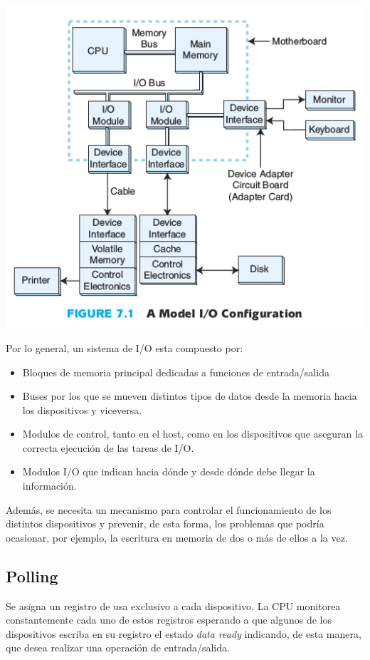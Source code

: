 \begin{center}
	\includegraphics[width=15cm, keepaspectratio=yes]{imagenes/iomodel.png}
\end{center}

Por lo general, un sistema de I/O esta compuesto por:
\begin{itemize}
	\item Bloques de memoria principal dedicadas a funciones de entrada/salida
	\item Buses por los que se mueven distintos tipos de datos desde la memoria hacia los dispositivos y viceversa.
	\item Modulos de control, tanto en el host, como en los dispositivos que aseguran la correcta ejecución de las tareas de I/O.
	\item Modulos I/O que indican hacia dónde y desde dónde debe llegar la información.
\end{itemize}

Además, se necesita un mecanismo para controlar el funcionamiento de los distintos dispositivos y prevenir, de esta forma, los problemas que podría ocasionar, por ejemplo, la escritura en memoria de dos o más de ellos a la vez.

\subsection{Polling}
Se asigna un registro de usa exclusivo a cada dispositivo. La CPU monitorea constantemente cada uno de estos registros esperando a que algunos de los dispositivos escriba en su registro el estado \textit{data ready} indicando, de esta manera, que desea realizar una operación de entrada/salida.

